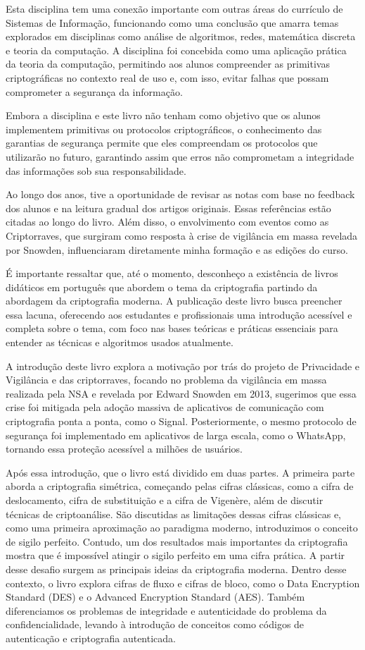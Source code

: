 Esta disciplina tem uma conexão importante com outras áreas do currículo de Sistemas de Informação, funcionando como uma conclusão que amarra temas explorados em disciplinas como análise de algoritmos, redes, matemática discreta e teoria da computação.
A disciplina foi concebida como uma aplicação prática da teoria da computação, permitindo aos alunos compreender as primitivas criptográficas no contexto real de uso e, com isso, evitar falhas que possam comprometer a segurança da informação.

Embora a disciplina e este livro não tenham como objetivo que os alunos implementem primitivas ou protocolos criptográficos, o conhecimento das garantias de segurança permite que eles compreendam os protocolos que utilizarão no futuro, garantindo assim que erros não comprometam a integridade das informações sob sua responsabilidade.

Ao longo dos anos, tive a oportunidade de revisar as notas com base no feedback dos alunos e na leitura gradual dos artigos originais.
Essas referências estão citadas ao longo do livro.
Além disso, o envolvimento com eventos como as Criptorraves, que surgiram como resposta à crise de vigilância em massa revelada por Snowden, influenciaram diretamente minha formação e as edições do curso.

É importante ressaltar que, até o momento, desconheço a existência de livros didáticos em português que abordem o tema da criptografia partindo da abordagem da criptografia moderna.
A publicação deste livro busca preencher essa lacuna, oferecendo aos estudantes e profissionais uma introdução acessível e completa sobre o tema, com foco nas bases teóricas e práticas essenciais para entender as técnicas e algoritmos usados atualmente.

A introdução deste livro explora a motivação por trás do projeto de Privacidade e Vigilância e das criptorraves, focando no problema da vigilância em massa realizada pela NSA e revelada por Edward Snowden em 2013, sugerimos que essa crise foi mitigada pela adoção massiva de aplicativos de comunicação com criptografia ponta a ponta, como o Signal.
Posteriormente, o mesmo protocolo de segurança foi implementado em aplicativos de larga escala, como o WhatsApp, tornando essa proteção acessível a milhões de usuários.

Após essa introdução, que o livro está dividido em duas partes.
A primeira parte aborda a criptografia simétrica, começando pelas cifras clássicas, como a cifra de deslocamento, cifra de substituição e a cifra de Vigenère, além de discutir técnicas de criptoanálise.
São discutidas as limitações dessas cifras clássicas e, como uma primeira aproximação ao paradigma moderno, introduzimos o conceito de sigilo perfeito.
Contudo, um dos resultados mais importantes da criptografia mostra que é impossível atingir o sigilo perfeito em uma cifra prática.
A partir desse desafio surgem as principais ideias da criptografia moderna.
Dentro desse contexto, o livro explora cifras de fluxo e cifras de bloco, como o Data Encryption Standard (DES) e o Advanced Encryption Standard (AES).
Também diferenciamos os problemas de integridade e autenticidade do problema da confidencialidade, levando à introdução de conceitos como códigos de autenticação e criptografia autenticada.


